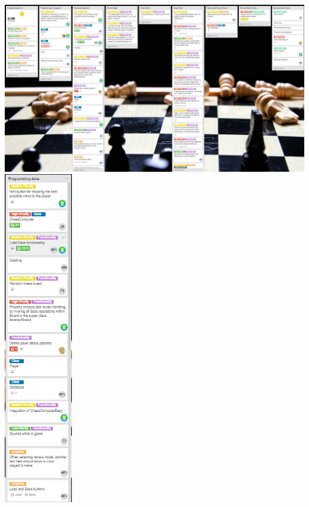 \documentclass{article}
\begin{document}
\includegraphics[width=16cm]{end.jpg} \\
\includegraphics[width=3cm]{programmingDone1.jpg}
\end{document}
